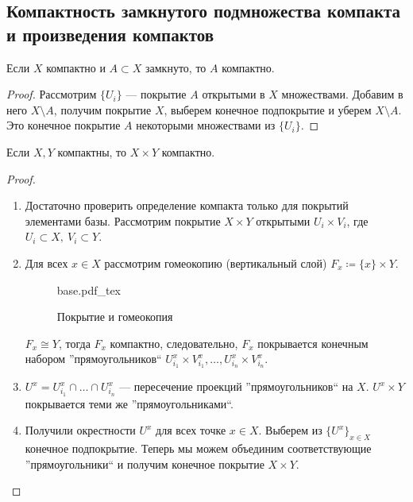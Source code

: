 \documentclass[11pt]{book}
\newcommand{\incfig}[1]{%
    \def\svgwidth{\columnwidth}
    {#1.pdf_tex}
}
\theoremstyle{definition}
\theoremstyle{plain}
\theoremstyle{plain}
\theoremstyle{definition}
\theoremstyle{remark}
\begin{document}
\subsection{Компактность замкнутого подмножества компакта и произведения компактов}
\begin{thm}
    Если $ X$ компактно и  $ A \subset X$ замкнуто, то $ A$ компактно.
\end{thm}
\begin{proof}
    Рассмотрим $ \{U_i\}$ --- покрытие  $ A$ открытыми в $ X$ множествами. Добавим в него  $ X \setminus A$, получим покрытие $ X$, выберем конечное подпокрытие и уберем $ X \setminus A$. Это конечное покрытие $ A$ некоторыми множествами из $ \{U_i\}$.
\end{proof}
\begin{thm}
    Если $ X, Y$ компактны, то  $ X \times Y$ компактно.
\end{thm}
\begin{proof}
    $ $
    \begin{enumerate}
	\item Достаточно проверить определение компакта только для покрытий элементами базы. Рассмотрим покрытие $ X \times Y$ открытыми $ U_i \times V_i$, где $ U_i \subset X, ~ V_i \subset Y$.
	\item Для всех $ x \in  X$ рассмотрим гомеокопию (вертикальный слой) $ F_x \coloneqq \{x\}\times  Y$.
	    \begin{figure}[ht]
		\centering
		\incfig{base}
		\caption{Покрытие и гомеокопия}
		\label{fig:base}
	    \end{figure}
	    $ F_x \cong Y$, тогда $F_x$  компактно, следовательно, $ F_x$ покрывается конечным набором ''прямоугольников`` $U_{i_1}^{x}\times V_{i_1}^{x}, \ldots , U_{i_n}^{x}\times V_{i_n}^{x} $.
	\item $ U^{x} = U_{i_1}^{x} \cap \ldots \cap U_{i_n}^{x}$ --- пересечение проекций ''прямоугольников`` на $ X$.  $ U^{x} \times Y$ покрывается теми же ''прямоугольниками``.
	\item Получили окрестности $ U^{x}$ для всех точке $ x \in  X$. Выберем из $ \{U^{x}\}_{x \in  X}$ конечное подпокрытие. Теперь мы можем объединим соответствующие ''прямоугольники`` и получим конечное покрытие $ X \times Y$.
    \end{enumerate}
\end{proof}
\end{document}

